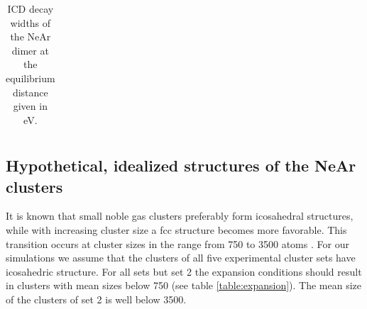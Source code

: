 \begin{figure}[h]
 \centering
 
 \caption{}
 \label{figure:fitted_NeAr_widths}
\end{figure}


\begin{table}
 \centering
 \caption{\ac{ICD} decay widths of the NeAr dimer at the equilibrium
          distance given in eV.}
 \begin{tabular}{lcccc}
 \end{tabular}
 \label{table:compare_gamma_near}
\end{table}



\subsection{Hypothetical, idealized structures of the NeAr clusters}

It is known that small noble gas clusters preferably form icosahedral structures,
while with increasing cluster size a fcc structure becomes more favorable. This transition
occurs at cluster sizes in the range from 750 to 3500 atoms \cite{Martin96,Doye97,Hartke02}.
For our simulations we assume that the clusters of all five experimental cluster sets have 
icosahedric structure. For all sets but set 2 the expansion conditions should result in clusters 
with mean sizes below 750 (see table \ref{table:expansion}). The mean size of the clusters of set 2 is well below 3500.


